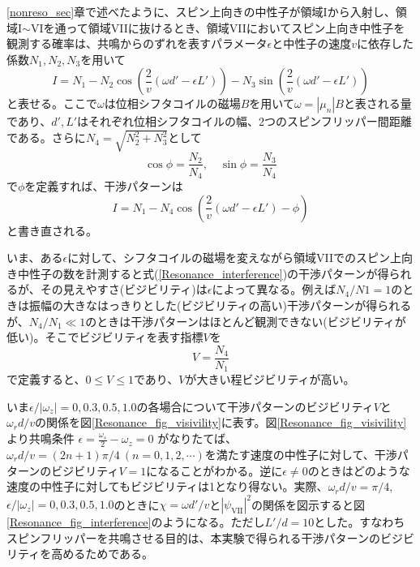 \ref{nonreso_sec}章で述べたように、スピン上向きの中性子が領域Iから入射し、領域I$\sim$VIを通って領域VIIに抜けるとき、領域VIIにおいてスピン上向き中性子を観測する確率は、共鳴からのずれを表すパラメータ$\epsilon$と中性子の速度$v$に依存した係数$N_1,N_2,N_3$を用いて
\begin{equation}
I=N_1-N_2\cos\left(\frac{2}{v}(\omega d'-\epsilon L')\right) -N_3\sin\left(\frac{2}{v}(\omega d'-\epsilon L')\right) \label{analysis_theory_ippan}
\end{equation}
と表せる。ここで$\omega$は位相シフタコイルの磁場$B$を用いて$\omega=|\mu_n|B$と表される量であり、$d',L'$はそれぞれ位相シフタコイルの幅、2つのスピンフリッパー間距離である。さらに$N_4=\sqrt{N_2^2+N_3^2}$として
\begin{equation}
\cos \phi=\frac{N_2}{N_4}, \quad \sin \phi=\frac{N_3}{N_4}
\end{equation}
で$\phi$を定義すれば、干渉パターンは
\begin{equation}
I=N_1-N_4\cos\left(\frac{2}{v}(\omega d'-\epsilon L')-\phi\right)\label{Resonance_interference}
\end{equation}
と書き直される。

いま、ある$\epsilon$に対して、シフタコイルの磁場を変えながら領域VIIでのスピン上向き中性子の数を計測すると式(\ref{Resonance_interference})の干渉パターンが得られるが、その見えやすさ(ビジビリティ)は$\epsilon$によって異なる。例えば$N_4/N1=1$のときは振幅の大きなはっきりとした(ビジビリティの高い)干渉パターンが得られるが、$N_4/N_1 \ll 1$のときは干渉パターンはほとんど観測できない(ビジビリティが低い)。そこでビジビリティを表す指標$V$を
\begin{equation}
V=\frac{N_4}{N_1}
\end{equation}
で定義すると、$0 \le V \le 1$であり、$V$が大きい程ビジビリティが高い。

いま$\epsilon/|\omega_z|=0,0.3,0.5,1.0$の各場合について干渉パターンのビジビリティ$V$と$\omega_r d/v$の関係を図\ref{Resonance_fig_visivility}に表す。図\ref{Resonance_fig_visivility}より共鳴条件
$
\epsilon=\frac{\omega_s}{2}-\omega_z=0
$
がなりたてば、$\omega_r d/v =(2n+1)\pi/4 \ (n =0,1,2,\cdots)$を満たす速度の中性子に対して、干渉パターンのビジビリティ$V=1$になることがわかる。逆に$\epsilon \neq 0$のときはどのような速度の中性子に対してもビジビリティは1となり得ない。実際、$\omega_rd/v=\pi/4$,$\epsilon/|\omega_z|=0,0.3,0.5,1.0$のときに$\chi=\omega d'/v$と$|\psi_\mathrm{VII}|^2$の関係を図示すると図\ref{Resonance_fig_interference}のようになる。ただし$L'/d=10$とした。すなわちスピンフリッパーを共鳴させる目的は、本実験で得られる干渉パターンのビジビリティを高めるためである。

